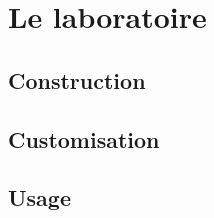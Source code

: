 \section{Le laboratoire}


\subsection{Construction} %





\subsection{Customisation} %





\subsection{Usage} %





